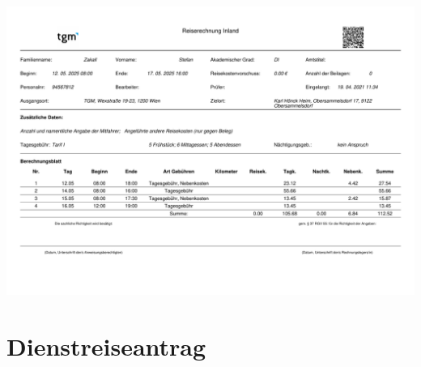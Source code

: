\begin{center}
	\includegraphics[width=\linewidth]{chapters/appendix/travel_invoice_szakall}
\end{center}


\section*{Dienstreiseantrag}
{}

%


